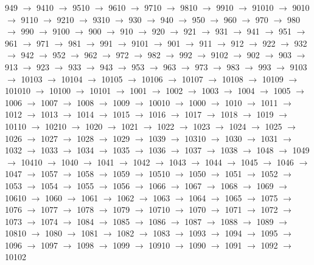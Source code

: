 949 $\rightarrow$ 9410 $\rightarrow$ 9510 $\rightarrow$ 9610 $\rightarrow$ 9710 $\rightarrow$ 9810 $\rightarrow$ 9910 $\rightarrow$ 91010 $\rightarrow$ 9010 $\rightarrow$ 9110 $\rightarrow$ 9210 $\rightarrow$ 9310 $\rightarrow$ 930 $\rightarrow$ 940 $\rightarrow$ 950 $\rightarrow$ 960 $\rightarrow$ 970 $\rightarrow$ 980 $\rightarrow$ 990 $\rightarrow$ 9100 $\rightarrow$ 900 $\rightarrow$ 910 $\rightarrow$ 920 $\rightarrow$ 921 $\rightarrow$ 931 $\rightarrow$ 941 $\rightarrow$ 951 $\rightarrow$ 961 $\rightarrow$ 971 $\rightarrow$ 981 $\rightarrow$ 991 $\rightarrow$ 9101 $\rightarrow$ 901 $\rightarrow$ 911 $\rightarrow$ 912 $\rightarrow$ 922 $\rightarrow$ 932 $\rightarrow$ 942 $\rightarrow$ 952 $\rightarrow$ 962 $\rightarrow$ 972 $\rightarrow$ 982 $\rightarrow$ 992 $\rightarrow$ 9102 $\rightarrow$ 902 $\rightarrow$ 903 $\rightarrow$ 913 $\rightarrow$ 923 $\rightarrow$ 933 $\rightarrow$ 943 $\rightarrow$ 953 $\rightarrow$ 963 $\rightarrow$ 973 $\rightarrow$ 983 $\rightarrow$ 993 $\rightarrow$ 9103 $\rightarrow$ 10103 $\rightarrow$ 10104 $\rightarrow$ 10105 $\rightarrow$ 10106 $\rightarrow$ 10107 $\rightarrow$ 10108 $\rightarrow$ 10109 $\rightarrow$ 101010 $\rightarrow$ 10100 $\rightarrow$ 10101 $\rightarrow$ 1001 $\rightarrow$ 1002 $\rightarrow$ 1003 $\rightarrow$ 1004 $\rightarrow$ 1005 $\rightarrow$ 1006 $\rightarrow$ 1007 $\rightarrow$ 1008 $\rightarrow$ 1009 $\rightarrow$ 10010 $\rightarrow$ 1000 $\rightarrow$ 1010 $\rightarrow$ 1011 $\rightarrow$ 1012 $\rightarrow$ 1013 $\rightarrow$ 1014 $\rightarrow$ 1015 $\rightarrow$ 1016 $\rightarrow$ 1017 $\rightarrow$ 1018 $\rightarrow$ 1019 $\rightarrow$ 10110 $\rightarrow$ 10210 $\rightarrow$ 1020 $\rightarrow$ 1021 $\rightarrow$ 1022 $\rightarrow$ 1023 $\rightarrow$ 1024 $\rightarrow$ 1025 $\rightarrow$ 1026 $\rightarrow$ 1027 $\rightarrow$ 1028 $\rightarrow$ 1029 $\rightarrow$ 1039 $\rightarrow$ 10310 $\rightarrow$ 1030 $\rightarrow$ 1031 $\rightarrow$ 1032 $\rightarrow$ 1033 $\rightarrow$ 1034 $\rightarrow$ 1035 $\rightarrow$ 1036 $\rightarrow$ 1037 $\rightarrow$ 1038 $\rightarrow$ 1048 $\rightarrow$ 1049 $\rightarrow$ 10410 $\rightarrow$ 1040 $\rightarrow$ 1041 $\rightarrow$ 1042 $\rightarrow$ 1043 $\rightarrow$ 1044 $\rightarrow$ 1045 $\rightarrow$ 1046 $\rightarrow$ 1047 $\rightarrow$ 1057 $\rightarrow$ 1058 $\rightarrow$ 1059 $\rightarrow$ 10510 $\rightarrow$ 1050 $\rightarrow$ 1051 $\rightarrow$ 1052 $\rightarrow$ 1053 $\rightarrow$ 1054 $\rightarrow$ 1055 $\rightarrow$ 1056 $\rightarrow$ 1066 $\rightarrow$ 1067 $\rightarrow$ 1068 $\rightarrow$ 1069 $\rightarrow$ 10610 $\rightarrow$ 1060 $\rightarrow$ 1061 $\rightarrow$ 1062 $\rightarrow$ 1063 $\rightarrow$ 1064 $\rightarrow$ 1065 $\rightarrow$ 1075 $\rightarrow$ 1076 $\rightarrow$ 1077 $\rightarrow$ 1078 $\rightarrow$ 1079 $\rightarrow$ 10710 $\rightarrow$ 1070 $\rightarrow$ 1071 $\rightarrow$ 1072 $\rightarrow$ 1073 $\rightarrow$ 1074 $\rightarrow$ 1084 $\rightarrow$ 1085 $\rightarrow$ 1086 $\rightarrow$ 1087 $\rightarrow$ 1088 $\rightarrow$ 1089 $\rightarrow$ 10810 $\rightarrow$ 1080 $\rightarrow$ 1081 $\rightarrow$ 1082 $\rightarrow$ 1083 $\rightarrow$ 1093 $\rightarrow$ 1094 $\rightarrow$ 1095 $\rightarrow$ 1096 $\rightarrow$ 1097 $\rightarrow$ 1098 $\rightarrow$ 1099 $\rightarrow$ 10910 $\rightarrow$ 1090 $\rightarrow$ 1091 $\rightarrow$ 1092 $\rightarrow$ 10102 